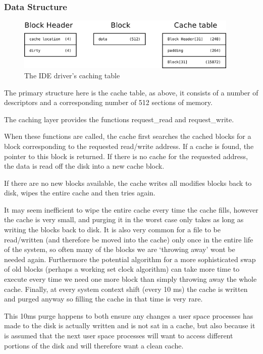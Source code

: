 \documentclass[a4paper]{report}
\begin{document}
\subsubsection{Data Structure}


\begin{figure}[ht]
\centering
\includegraphics[width=400px]{images/Caching_Table}
\caption{The IDE driver's caching table}
\label{fig:WinTitleBarScreen}
\end{figure}

The primary structure here is the cache table, as above, it consists of a number of descriptors and a corresponding number of 512 sections of memory.

The caching layer provides the functions request\_read and request\_write.

When these functions are called, the cache first searches the cached blocks for a block corresponding to the requested read/write address. If a cache is found, the pointer to this block is returned. If there is no cache for the requested address, the data is read off the disk into a new cache block.

If there are no new blocks available, the cache writes all modifies blocks back to disk, wipes the entire cache and then tries again.

It may seem inefficient to wipe the entire cache every time the cache fills, however the cache is very small, and purging it in the worst case only takes as long as writing the blocks back to disk. It is also very common for a file to be read/written (and therefore be moved into the cache) only once in the entire life of the system, so often many of the blocks we are `throwing away' wont be needed again. Furthermore the potential algorithm for a more sophisticated swap of old blocks (perhaps a working set clock algorithm) can take more time to execute every time we need one more block than simply throwing away the whole cache. Finally, at every system context shift (every 10 ms) the cache is written and purged anyway so filling the cache in that time is very rare.

This 10ms purge happens to both ensure any changes a user space processes has made to the disk is actually written and is not sat in a cache, but also because it is assumed that the next user space processes will want to access different portions of the disk and will therefore want a clean cache.
\end{document}
